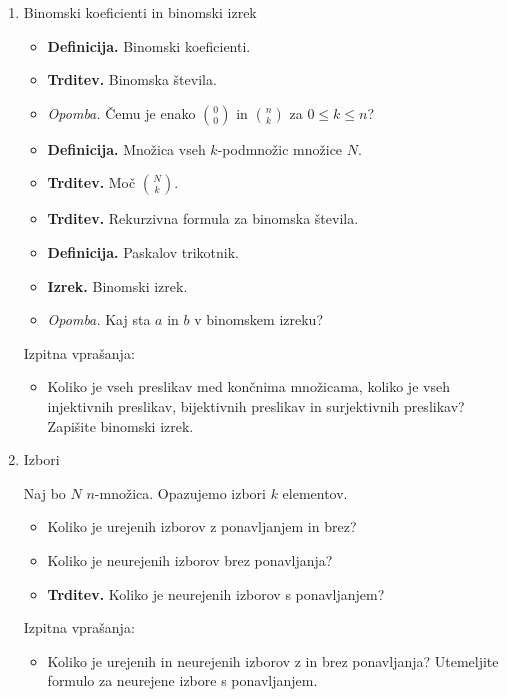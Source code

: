 \begin{enumerate}
    \item Binomski koeficienti in binomski izrek
    \begin{itemize}
        \item \colorbox{purple!30}{\textbf{Definicija.}} Binomski koeficienti.
        \item \colorbox{blue!30}{\textbf{Trditev.}} Binomska števila.
        \item \colorbox{yellow!30}{\emph{Opomba.}} Čemu je enako \(\binom{0}{0}\) in \(\binom{n}{k}\) za \(0 \leq k \leq n\)?
        \item \colorbox{purple!30}{\textbf{Definicija.}} Množica vseh \(k\)-podmnožic množice \(N\).
        \item \colorbox{blue!30}{\textbf{Trditev.}} Moč \(\binom{N}{k}\).
        \item \colorbox{blue!30}{\textbf{Trditev.}} Rekurzivna formula za binomska števila.
        \item \colorbox{purple!30}{\textbf{Definicija.}} Paskalov trikotnik.
        \item \colorbox{blue!30}{\textbf{Izrek.}} Binomski izrek. 
        \item \colorbox{yellow!30}{\emph{Opomba.}} Kaj sta \(a\) in \(b\) v binomskem izreku?
    \end{itemize}

    Izpitna vprašanja:
    \begin{itemize}
        \item Koliko je vseh preslikav med končnima množicama, koliko je vseh injektivnih preslikav, bijektivnih preslikav in surjektivnih preslikav? Zapišite binomski izrek.
    \end{itemize}

    \item Izbori
    
    Naj bo \(N\) \(n\)-množica. Opazujemo izbori \(k\) elementov.
    \begin{itemize}
        \item Koliko je urejenih izborov z ponavljanjem in brez?
        \item Koliko je neurejenih izborov brez ponavljanja?
        \item \colorbox{blue!30}{\textbf{Trditev.}} Koliko je neurejenih izborov s ponavljanjem?
    \end{itemize}
    
    Izpitna vprašanja:
    \begin{itemize}
        \item Koliko je urejenih in neurejenih izborov z in brez ponavljanja? Utemeljite formulo za neurejene izbore s ponavljanjem.
    \end{itemize}


\end{enumerate}
